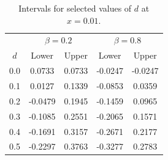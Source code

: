 \begin{table}[ht]
\centering
\caption{Intervals for selected values of $d$ at $x=0.01$.}
\label{tab:tipping-values}
\small
\begin{tabular}{c|cc|cc}
\hline
& \multicolumn{2}{c|}{$\beta=0.2$} & \multicolumn{2}{c}{$\beta=0.8$}\\
$d$ & Lower & Upper & Lower & Upper\\
\hline
0.0 & 0.0733 & 0.0733 & -0.0247 & -0.0247 \\
0.1 & 0.0127 & 0.1339 & -0.0853 & 0.0359 \\
0.2 & -0.0479 & 0.1945 & -0.1459 & 0.0965 \\
0.3 & -0.1085 & 0.2551 & -0.2065 & 0.1571 \\
0.4 & -0.1691 & 0.3157 & -0.2671 & 0.2177 \\
0.5 & -0.2297 & 0.3763 & -0.3277 & 0.2783 \\
\hline
\end{tabular}
\end{table}
